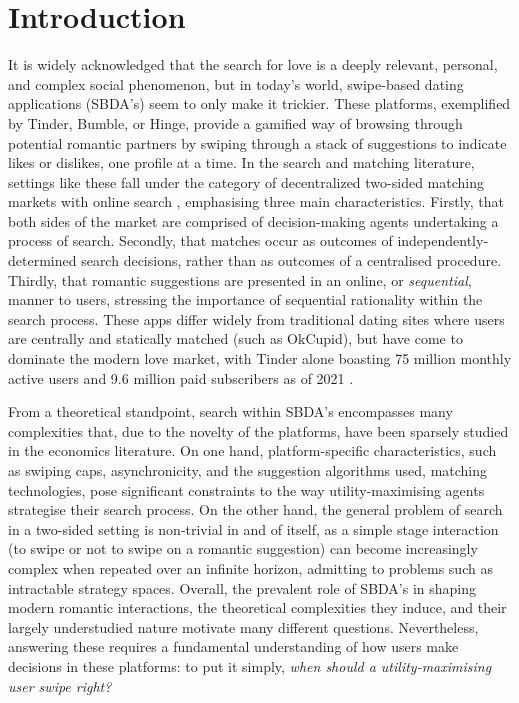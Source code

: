 \section{Introduction}
\label{sec:Introduction} 

It is widely acknowledged that the search for love is a deeply relevant, personal, and complex social phenomenon, but in today's world, swipe-based dating applications (SBDA's) seem to only make it trickier. 
These platforms, exemplified by Tinder, Bumble, or Hinge, provide a gamified way of browsing through potential romantic partners by swiping through a stack of suggestions to indicate likes or dislikes, one profile at a time. 
In the search and matching literature, settings like these fall under the category of decentralized two-sided matching markets with online search \citep{kanoria2021facilitating}, emphasising three main characteristics. 
Firstly, that both sides of the market are comprised of decision-making agents undertaking a process of search. 
Secondly, that matches occur as outcomes of independently-determined search decisions, rather than as outcomes of a centralised procedure. Thirdly, that romantic suggestions are presented in an online, or \textit{sequential}, manner to users, stressing the importance of sequential rationality within the search process. 
These apps differ widely from traditional dating sites where users are centrally and statically matched (such as OkCupid), but have come to dominate the modern love market, with Tinder alone boasting 75 million monthly active users and 9.6 million paid subscribers as of 2021 \citep{web:tinder_stats}.


From a theoretical standpoint, search within SBDA's encompasses many complexities that, due to the novelty of the platforms, have been sparsely studied in the economics literature. 
On one hand, platform-specific characteristics, such as swiping caps, asynchronicity, and the suggestion algorithms used, matching technologies, pose significant constraints to the way utility-maximising agents strategise their search process.
On the other hand, the general problem of search in a two-sided setting is non-trivial in and of itself, as a simple stage interaction (to swipe or not to swipe on a romantic suggestion) can become increasingly complex when repeated over an infinite horizon, admitting to problems such as intractable strategy spaces. 
Overall, the prevalent role of SBDA's in shaping modern romantic interactions, the theoretical complexities they induce, and their largely understudied nature motivate many different questions. 
Nevertheless, answering these requires a fundamental understanding of how users make decisions in these platforms: to put it simply, \textit{when should a utility-maximising user swipe right?} 


